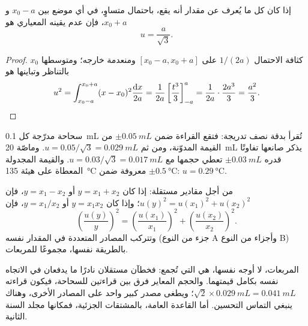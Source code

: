 \begin{proposition}\label{prop:b1:lab-techniques-1:type-b}
إذا كان كل ما يُعرف عن مقدار أنه يقع، باحتمال
متساوٍ، في أي موضع بين $x_0 - a$ و$x_0 + a$، فإن عدم يقينه
المعياري هو
\[
  u = \frac{a}{\sqrt3}.
\]
\end{proposition}
\begin{proof}
كثافة الاحتمال $1/(2a)$ على $[x_0 - a, x_0 + a]$ ومنعدمة
خارجه؛ ومتوسطها $x_0$ بالتناظر وتباينها هو
\[
  u^2 = \int_{x_0-a}^{x_0+a} (x - x_0)^2 \frac{\mathrm{d}x}{2a}
      = \frac{1}{2a} \left[\frac{t^3}{3}\right]_{-a}^{a}
      = \frac{1}{2a}\cdot\frac{2a^3}{3} = \frac{a^2}{3}. \qedhere
\]
\end{proof}

\begin{example}
سحاحة مدرّجة كل \qty{0.1}{mL} تُقرأ بدقة نصف تدريجة: فتقع
القراءة ضمن $\pm\qty{0.05}{mL}$ من القيمة المدوّنة، ومن ثم
$u = 0.05/\sqrt3 = \qty{0.029}{mL}$. وماصّة \qty{20}{mL} يذكر صانعها
تفاوتًا قدره $\pm\qty{0.03}{mL}$ تعطي حجمها مع
$u = 0.03/\sqrt3 = \qty{0.017}{mL}$. والقيمة المجدولة المعطاة على هيئة
\qty{135}{\celsius} معروفة ضمن $\pm\qty{0.5}{\celsius}$: $u = \qty{0.29}{\celsius}$.
\end{example}

\begin{proposition}\label{prop:b1:lab-techniques-1:combine}
من أجل مقادير مستقلة: إذا كان $y = x_1 + x_2$ أو $y = x_1 - x_2$، فإن
$u(y)^2 = u(x_1)^2 + u(x_2)^2$؛ وإذا كان $y = x_1 x_2$ أو $y = x_1/x_2$، فإن
\[
  \left(\frac{u(y)}{y}\right)^2 = \left(\frac{u(x_1)}{x_1}\right)^2
  + \left(\frac{u(x_2)}{x_2}\right)^2 .
\]
وتتركب المصادر المتعددة  في المقدار نفسه (جزء من النوع A
وأجزاء من النوع B) بالطريقة نفسها، مجموعًا للمربعات.
\end{proposition}
\admitted

المربعات، لا أوجه  نفسها، هي التي تُجمع: فخطآن مستقلان
نادرًا ما يدفعان في الاتجاه نفسه بكامل قيمتهما. والحجم المعاير
فرق بين قراءتين للسحاحة، فيكون  قراءته
$\sqrt2 \times \qty{0.029}{mL} = \qty{0.041}{mL}$؛ ويطغى مصدر كبير واحد
 على المصادر الأخرى، وهناك ينبغي التماس
التحسين. أما القاعدة العامة، بالمشتقات الجزئية، فمكانها
مجلد السنة الثانية.

